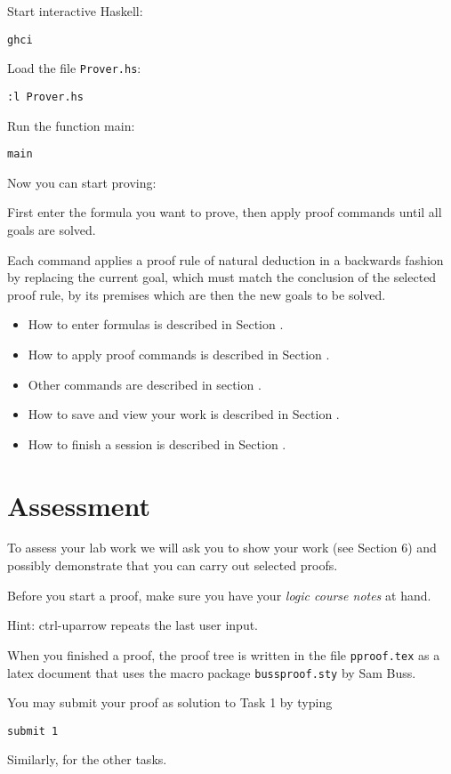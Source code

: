 \documentclass[12pt]{article}
\begin{document}
Start interactive Haskell:
\begin{verbatim}
ghci
\end{verbatim}
%
Load the file \texttt{Prover.hs}:
\begin{verbatim}
:l Prover.hs
\end{verbatim}
%
Run the function main:
\begin{verbatim}
main
\end{verbatim}
%
Now you can start proving: 

First enter the formula you want to prove, 
        then apply proof commands until all goals are solved.

Each command applies a proof rule of natural deduction 
        in a backwards fashion by replacing the current goal, 
        which must match the conclusion of the selected proof rule,
        by its premises which are then the new goals to be solved.
%
\begin{itemize}
\item How to enter formulas is described in Section \label{sec-syntax}.
\item How to apply proof commands is described in Section \label{sec-proof}.
\item Other commands are described in section \label{sec-control}.
\item How to save and view your work is described in Section \label{sec-save}.
\item How to finish a session is described in Section \label{sec-finish}.
\end{itemize}



\section{Assessment}
\label{sec-assess}
%
To assess your lab work we will ask you to show your work (see Section 6)
and possibly demonstrate that you can carry out selected proofs.

Before you start a proof, make sure you have your \emph{logic course notes} 
at hand.

Hint: ctrl-uparrow repeats the last user input. 

When you finished a proof, the proof tree is written in the file 
\texttt{pproof.tex} as a latex document that uses the macro package 
\texttt{bussproof.sty} by Sam Buss.

You may submit your proof as solution to Task 1 by typing
%
\begin{verbatim}
submit 1
\end{verbatim}
%
Similarly, for the other tasks.
\end{document}
